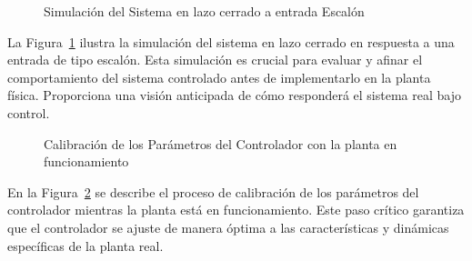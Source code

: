 \documentclass[conference,onecolumn]{IEEEtran}
\begin{document}
\begin{figure}[H]
    \centering
    \caption{Simulación del Sistema en lazo cerrado a entrada Escalón}
    \label{fig:close_loop_response_simulation}
\end{figure}

La Figura~\ref{fig:close_loop_response_simulation} ilustra la simulación del sistema en lazo cerrado en respuesta a una entrada de tipo escalón. Esta simulación es crucial para evaluar y afinar el comportamiento del sistema controlado antes de implementarlo en la planta física. Proporciona una visión anticipada de cómo responderá el sistema real bajo control.

\begin{figure}[H]
    \centering
    \caption{Calibración de los Parámetros del Controlador con la planta en funcionamiento}
    \label{fig:close_loop_pid_calibration}
\end{figure}
En la Figura~\ref{fig:close_loop_pid_calibration} se describe el proceso de calibración de los parámetros del controlador mientras la planta está en funcionamiento. Este paso crítico garantiza que el controlador se ajuste de manera óptima a las características y dinámicas específicas de la planta real.
\end{document}
